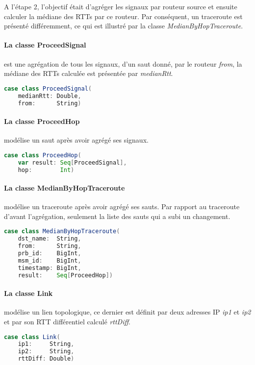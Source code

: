 A l'étape 2, l'objectif était d'agréger  les signaux par routeur source et ensuite calculer la médiane des RTTs par ce routeur. Par conséquent, un traceroute est présenté différemment, ce qui est  illustré par la classe \textit{MedianByHopTraceroute}.

\paragraph{La classe ProceedSignal }  est une agrégation de tous les signaux, d'un saut donné, par le routeur \textit{from},  la médiane des RTTs calculée est présentée par \textit{medianRtt}.
\begin{lstlisting}[language=scala]
case class ProceedSignal(
	medianRtt: Double,
	from:      String)
\end{lstlisting}
\paragraph{La classe ProceedHop } modélise un saut après avoir agrégé ses signaux. 
\begin{lstlisting}[language=scala]
case class ProceedHop(
	var result: Seq[ProceedSignal],
	hop:        Int)
\end{lstlisting}


\paragraph{La classe MedianByHopTraceroute } modélise un traceroute après avoir agrégé ses sauts. Par rapport au traceroute d'avant l'agrégation, seulement la liste des sauts qui a subi un changement. 
\begin{lstlisting}[language=scala]
case class MedianByHopTraceroute(
	dst_name:  String,
	from:      String,
	prb_id:    BigInt,
	msm_id:    BigInt,
	timestamp: BigInt,
	result:    Seq[ProceedHop])
\end{lstlisting}


\paragraph{La classe Link} modélise un lien topologique, ce dernier est définit par deux adresses IP  \textit{ip1} et \textit{ip2} et par son RTT différentiel calculé \textit{rttDiff}.
\begin{lstlisting}[language=scala]
case class Link(
	ip1:     String,
	ip2:     String,
	rttDiff: Double)
\end{lstlisting}

